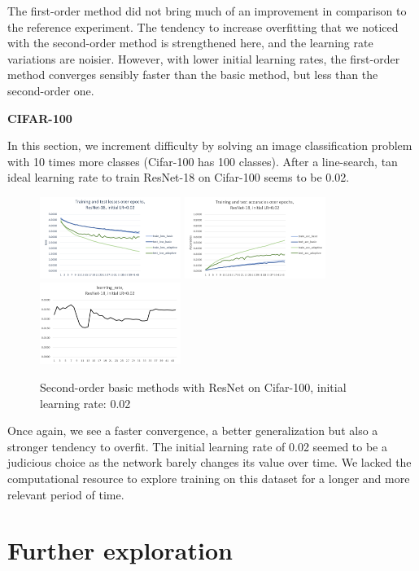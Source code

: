\documentclass{article}
\begin{document}
   The first-order method did not bring much of an improvement in comparison to the reference experiment. The tendency to increase overfitting that we noticed with the second-order method is strengthened here, and the learning rate variations are noisier. However, with lower initial learning rates, the first-order method converges sensibly faster than the basic method, but less than the second-order one. 
  
  \textbf{CIFAR-100}
  
  In this section, we increment difficulty by solving an image classification problem with 10 times more classes (Cifar-100 \cite{cifar} has 100 classes). After a line-search, tan ideal learning rate to train ResNet-18 on Cifar-100 seems to be 0.02.

  \begin{figure}[!h]
	\includegraphics[width=130pt]{loss_resnet_100_0_02.png}
	\includegraphics[width=130pt]{acc_resnet_100_0_02.png}
	\includegraphics[width=130pt]{lr_resnet_100_0_02.png}
	\caption{Second-order basic methods with ResNet on Cifar-100, initial learning rate: 0.02}
  \end{figure}
  
  Once again, we see a faster convergence, a better generalization but also a stronger tendency to overfit. The initial learning rate of 0.02 seemed to be a judicious choice as the network barely changes its value over time. We lacked the computational resource to explore training on this dataset for a longer and more relevant period of time. 
  
  \section{Further exploration}
  
\end{document}
